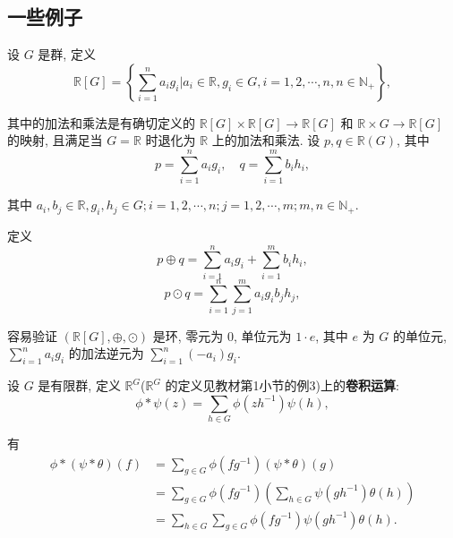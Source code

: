\documentclass{ctexart}
\begin{document}
\subsection{一些例子}
\begin{example}
    设 $G$ 是群, 定义
    \[\mathbb{R}[G]=\left\{\sum\limits_{i=1}^{n}a_ig_i\bigg|a_i\in\mathbb{R},g_i\in G,i=1,2,\cdots,n,n\in\mathbb{N}_+\right\},\]

    其中的加法和乘法是有确切定义的 $\mathbb{R}[G]\times\mathbb{R}[G]\to\mathbb{R}[G]$ 和 $\mathbb{R}\times G\to\mathbb{R}[G]$ 的映射, 且满足当 $G=\mathbb{R}$ 时退化为 $\mathbb{R}$ 上的加法和乘法. 设 $p,q\in\mathbb{R}(G)$, 其中
    \[p=\sum\limits_{i=1}^{n}a_ig_i,\quad q=\sum\limits_{i=1}^{m}b_ih_i,\]

    其中 $a_i,b_j\in\mathbb{R},g_i,h_j\in G;i=1,2,\cdots,n;j=1,2,\cdots,m;m,n\in\mathbb{N}_+$.

    定义
    \[p\oplus q=\sum\limits_{i=1}^{n}a_ig_i+\sum\limits_{i=1}^{m}b_ih_i,\]
    \[p\odot q=\sum\limits_{i=1}^{n}\sum\limits_{j=1}^{m}a_ig_ib_jh_j,\]

    容易验证 $(\mathbb{R}[G],\oplus,\odot)$ 是环, 零元为 $0$, 单位元为 $1\cdot e$, 其中 $e$ 为 $G$ 的单位元, $\sum\limits_{i=1}^{n}a_ig_i$ 的加法逆元为 $\sum\limits_{i=1}^{n}(-a_i)g_i$.

    设 $G$ 是有限群, 定义 $\mathbb{R}^G$($\mathbb{R}^G$ 的定义见教材第1小节的例3)上的\textbf{卷积运算}:
    \[\phi*\psi(z)=\sum\limits_{h\in G}\phi(zh^{-1})\psi(h),\]

    有
    \begin{align*}
        \phi*(\psi*\theta)(f) & =\sum\limits_{g\in G}\phi(fg^{-1})(\psi*\theta)(g) \\
        & =\sum\limits_{g\in G}\phi(fg^{-1})\left(\sum\limits_{h\in G}\psi(gh^{-1})\theta(h)\right) \\
        & =\sum\limits_{h\in G}\sum\limits_{g\in G}\phi(fg^{-1})\psi(gh^{-1})\theta(h).
    \end{align*}


\end{example}
\end{document}
